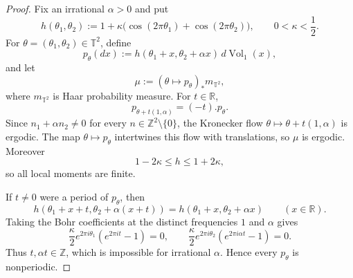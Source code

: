 \documentclass[11pt,reqno,a4paper]{amsart}
\numberwithin{equation}{section}
\theoremstyle{compact}
\theoremstyle{definition}
\theoremstyle{definition}
\newcommand{\Vol}{\operatorname{Vol}}
\begin{document}
\begin{proof}
Fix an irrational $\alpha>0$ and put
\[
  h(\theta_1,\theta_2)
  :=1+\kappa\bigl(\cos(2\pi\theta_1)+\cos(2\pi\theta_2)\bigr),
  \qquad 0<\kappa<\frac12.
\]
For $\theta=(\theta_1,\theta_2)\in\mathbb T^2$, define
\begin{equation}\label{eq:all-order-diffuse-density}
  p_\theta(dx)
  :=h(\theta_1+x,\theta_2+\alpha x)\,d\Vol_1(x),
\end{equation}
and let
\[
  \mu:=(\theta\mapsto p_\theta)_*m_{\mathbb T^2},
\]
where $m_{\mathbb T^2}$ is Haar probability measure.  For
$t\in\mathbb R$,
\[
  p_{\theta+t(1,\alpha)}=(-t).p_\theta.
\]
Since $n_1+\alpha n_2\neq0$ for every
$n\in\mathbb Z^2\setminus\{0\}$, the Kronecker flow
$\theta\mapsto\theta+t(1,\alpha)$ is ergodic.  The map
$\theta\mapsto p_\theta$ intertwines this flow with translations, so $\mu$ is
ergodic.  Moreover
\[
  1-2\kappa\leq h\leq1+2\kappa,
\]
so all local moments are finite.

If $t\neq0$ were a period of $p_\theta$, then
\[
  h(\theta_1+x+t,\theta_2+\alpha(x+t))
  =h(\theta_1+x,\theta_2+\alpha x)
  \qquad(x\in\mathbb R).
\]
Taking the Bohr coefficients at the distinct frequencies $1$ and $\alpha$
gives
\[
  \frac{\kappa}{2}e^{2\pi i\theta_1}(e^{2\pi i t}-1)=0,
  \qquad
  \frac{\kappa}{2}e^{2\pi i\theta_2}(e^{2\pi i\alpha t}-1)=0.
\]
Thus $t,\alpha t\in\mathbb Z$, which is impossible for irrational $\alpha$.
Hence every $p_\theta$ is nonperiodic.


\end{proof}
\end{document}
